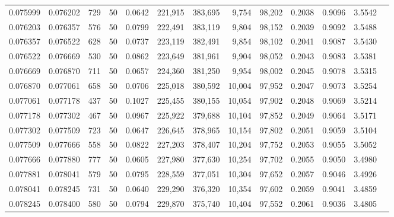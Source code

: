 \begin{tabular}{rrrrrrrrrrrrr}
0.075999 & 0.076202 &   729 &  50 &                                     0.0642 & 221,915 & 383,695 &   9,754 &  98,202 & 0.2038 & 0.9096 & 3.5542 \\
0.076203 & 0.076357 &   576 &  50 &                                     0.0799 & 222,491 & 383,119 &   9,804 &  98,152 & 0.2039 & 0.9092 & 3.5488 \\
0.076357 & 0.076522 &   628 &  50 &                                     0.0737 & 223,119 & 382,491 &   9,854 &  98,102 & 0.2041 & 0.9087 & 3.5430 \\
0.076522 & 0.076669 &   530 &  50 &                                     0.0862 & 223,649 & 381,961 &   9,904 &  98,052 & 0.2043 & 0.9083 & 3.5381 \\
0.076669 & 0.076870 &   711 &  50 &                                     0.0657 & 224,360 & 381,250 &   9,954 &  98,002 & 0.2045 & 0.9078 & 3.5315 \\
0.076870 & 0.077061 &   658 &  50 &                                     0.0706 & 225,018 & 380,592 &  10,004 &  97,952 & 0.2047 & 0.9073 & 3.5254 \\
0.077061 & 0.077178 &   437 &  50 &                                     0.1027 & 225,455 & 380,155 &  10,054 &  97,902 & 0.2048 & 0.9069 & 3.5214 \\
0.077178 & 0.077302 &   467 &  50 &                                     0.0967 & 225,922 & 379,688 &  10,104 &  97,852 & 0.2049 & 0.9064 & 3.5171 \\
0.077302 & 0.077509 &   723 &  50 &                                     0.0647 & 226,645 & 378,965 &  10,154 &  97,802 & 0.2051 & 0.9059 & 3.5104 \\
0.077509 & 0.077666 &   558 &  50 &                                     0.0822 & 227,203 & 378,407 &  10,204 &  97,752 & 0.2053 & 0.9055 & 3.5052 \\
0.077666 & 0.077880 &   777 &  50 &                                     0.0605 & 227,980 & 377,630 &  10,254 &  97,702 & 0.2055 & 0.9050 & 3.4980 \\
0.077881 & 0.078041 &   579 &  50 &                                     0.0795 & 228,559 & 377,051 &  10,304 &  97,652 & 0.2057 & 0.9046 & 3.4926 \\
0.078041 & 0.078245 &   731 &  50 &                                     0.0640 & 229,290 & 376,320 &  10,354 &  97,602 & 0.2059 & 0.9041 & 3.4859 \\
0.078245 & 0.078400 &   580 &  50 &                                     0.0794 & 229,870 & 375,740 &  10,404 &  97,552 & 0.2061 & 0.9036 & 3.4805 \\

\end{tabular}
